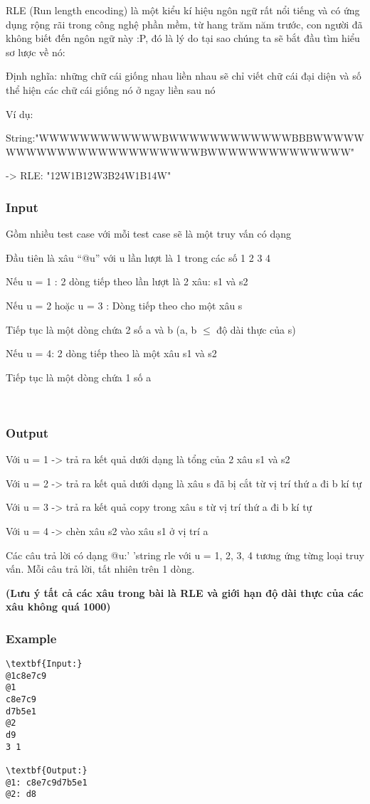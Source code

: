 

RLE (Run length encoding) là một kiểu kí hiệu ngôn ngữ rất nổi tiếng và có ứng dụng rộng rãi trong công nghệ phần mềm, từ hang trăm năm trước, con người đã không biết đến ngôn ngữ này :P, đó là lý do tại sao chúng ta sẽ bắt đầu tìm hiểu sơ lược về nó:

Định nghĩa: những chữ cái giống nhau liền nhau sẽ chỉ viết chữ cái đại diện và số thể hiện các chữ cái giống nó ở ngay liền sau nó

Ví dụ:

String:"WWWWWWWWWWWWBWWWWWWWWWWWWBBBWWWWWWWWWWWWWWWWWWWWWWWWBWWWWWWWWWWWWWW" \textbf{}

-> RLE: "12W1B12W3B24W1B14W"

\subsubsection{Input}

Gồm nhiều test case với mỗi test case sẽ là một truy vấn có dạng

Đầu tiên là xâu “@u” với u lần lượt là 1 trong các số 1 2 3 4

Nếu u = 1 : 2 dòng tiếp theo lần lượt là 2 xâu: s1 và s2

Nếu u = 2 hoặc u = 3 : Dòng tiếp theo cho một xâu s

Tiếp tục là một dòng chứa 2 số a và b (a, b  $\le$  độ dài thực của s)

Nếu u = 4: 2 dòng tiếp theo là một xâu s1 và s2

Tiếp tục là một dòng chứa 1 số a

 

\subsubsection{Output}

Với u = 1 -> trả ra kết quả dưới dạng là tổng của 2 xâu s1 và s2

Với u = 2 -> trả ra kết quả dưới dạng là xâu s đã bị cắt từ vị trí thứ a đi b kí tự

Với u = 3 -> trả ra kết quả copy trong xâu s từ vị trí thứ a đi b kí tự

Với u = 4 -> chèn xâu s2 vào xâu s1 ở vị trí a

Các câu trả lời có dạng @u:' 'string rle với u = 1, 2, 3, 4 tương ứng từng loại truy vấn. Mỗi câu trả lời, tất nhiên trên 1 dòng.

\textbf{(Lưu ý tất cả các xâu trong bài là RLE và giới hạn độ dài thực của các xâu không quá 1000) }\textbf{}

\subsubsection{Example}
\begin{verbatim}
\textbf{Input:}
@1c8e7c9
@1
c8e7c9
d7b5e1
@2
d9
3 1

\textbf{Output:}
@1: c8e7c9d7b5e1
@2: d8\end{verbatim}
